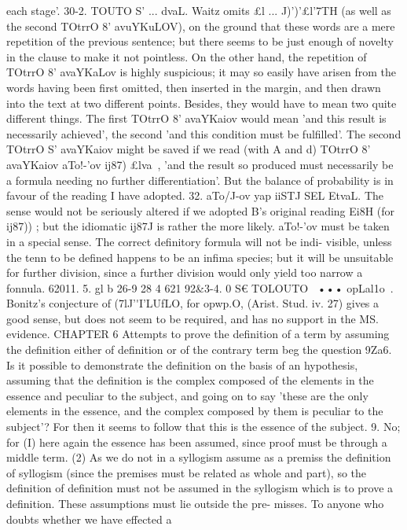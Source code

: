 {{{{{{{{{{{{{{{{{{{{each stage'.
30-2. TOUTO S' ... dvaL. Waitz omits £l ... J)')'£l'7TH (as well
as the second TOtrrO 8' avuYKuLOV), on the ground that these words
are a mere repetition of the previous sentence; but there seems
to be just enough of novelty in the clause to make it not pointless.
On the other hand, the repetition of TOtrrO 8' avaYKaLov is highly
suspicious; it may so easily have arisen from the words having
been first omitted, then inserted in the margin, and then drawn
into the text at two different points. Besides, they would have
to mean two quite different things. The first TOtrrO 8' avaYKaiov
would mean 'and this result is necessarily achieved', the second
'and this condition must be fulfilled'. The second TOtrrO S'
avaYKaiov might be saved if we read (with A and d) TOtrrO 8'
avaYKaiov aTo!-'ov ij87) £lva~, 'and the result so produced must
necessarily be a formula needing no further differentiation'. But
the balance of probability is in favour of the reading I have
adopted.
32. aTo/J-ov yap iiSTJ SEL EtvaL. The sense would not be seriously
altered if we adopted B's original reading Ei8H (for ij87)) ; but the
idiomatic ij87J is rather the more likely. aTo!-'ov must be taken in
a special sense. The correct definitory formula will not be indi-
visible, unless the tenn to be defined happens to be an infima
species; but it will be unsuitable for further division, since a
further division would only yield too narrow a fonnula.
62011. 5.
gl b 26-9 28 4
621
92&3-4. 0 S€ TOLOUTO~ ••• opLal1o~. Bonitz's conjecture of
(7lJ'\'\0I'LUfLO, for opwp.O, (Arist. Stud. iv. 27) gives a good sense, but
does not seem to be required, and has no support in the MS.
evidence.
CHAPTER 6
Attempts to prove the definition of a term by assuming the definition
either of definition or of the contrary term beg the question
9Za6. Is it possible to demonstrate the definition on the basis
of an hypothesis, assuming that the definition is the complex
composed of the elements in the essence and peculiar to the
subject, and going on to say 'these are the only elements in
the essence, and the complex composed by them is peculiar to
the subject'? For then it seems to follow that this is the essence
of the subject.
9. No; for (I) here again the essence has been assumed, since
proof must be through a middle term. (2) As we do not in a
syllogism assume as a premiss the definition of syllogism (since
the premises must be related as whole and part), so the definition
of definition must not be assumed in the syllogism which is to
prove a definition. These assumptions must lie outside the pre-
misses. To anyone who doubts whether we have effected a
}}}}}}}}}}}}}}}}}}}}

